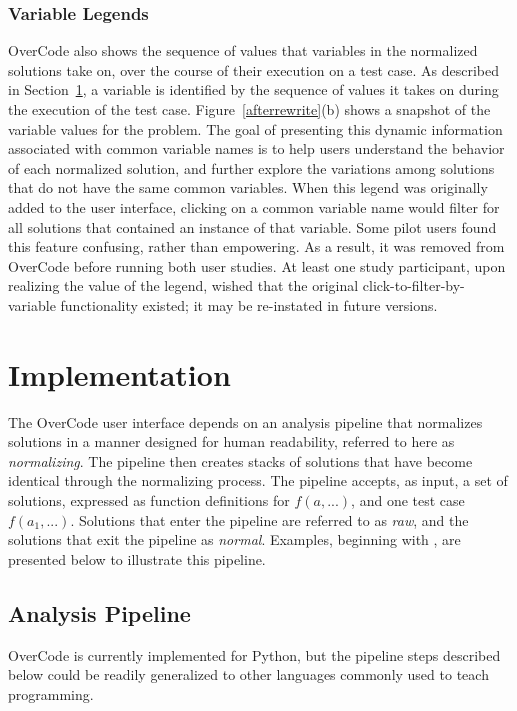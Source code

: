 \subsubsection{Variable Legends} OverCode also shows the sequence of values that variables in the normalized solutions take on, over the course of their execution on a test case. As described in Section~\ref{pipeline}, a variable is identified by the sequence of values it takes on during the execution of the test case. Figure~\ref{afterrewrite}(b) shows a snapshot of the variable values for the  problem. The goal of presenting this dynamic information associated with common variable names is to help users understand the behavior of each normalized solution, and further explore the variations among solutions that do not have the same common variables. When this legend was originally added to the user interface, clicking on a common variable name would filter for all solutions that contained an instance of that variable. Some pilot users found this feature confusing, rather than empowering. As a result, it was removed from OverCode before running both user studies. At least one study participant, upon realizing the value of the legend, wished that the original click-to-filter-by-variable functionality existed; it may be re-instated in future versions.

\section{Implementation} \label{pipeline}
The OverCode user interface depends on an analysis pipeline that normalizes solutions in a manner designed for human readability, referred to here as \emph{normalizing}. The pipeline then creates stacks of solutions that have become identical through the normalizing process. The pipeline accepts, as input, a set of solutions, expressed as function definitions for $f(a,...)$, and one test case $f(a_{1},...)$. Solutions that enter the pipeline are referred to as \emph{raw}, and the solutions that exit the pipeline as \emph{normal}. Examples, beginning with , are presented below to illustrate this pipeline.

\subsection{Analysis Pipeline}
OverCode is currently implemented for Python, but the pipeline steps described below could be readily generalized to other languages commonly used to teach programming.

